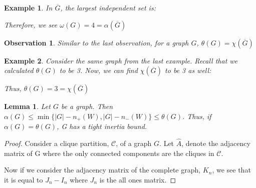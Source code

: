 \documentclass[12pt]{article}
\theoremstyle{parenbold}
\newtheorem{exmp}{Example}[section]
\newtheorem{observation}{Observation}[section]
\newtheorem{lemma}{Lemma}[section]
\begin{document}
\begin{exmp}
In $\overline{G}$, the largest independent set is:


Therefore, we see $\omega(G) = 4 = \alpha(\overline{G})$

\end{exmp}

\begin{observation} \label{obs2}
Similar to the last observation, for a graph $G$, $\theta(G) = \chi(\overline{G})$
\end{observation}

\begin{exmp}
Consider the same graph from the last example. Recall that we calculated $\theta(G)$ to be 3. Now, we can find $\chi(\overline{G})$ to be 3 as well:


Thus, $\theta(G) = 3 = \chi(\overline{G})$

\end{exmp}

\begin{lemma} \label{lem:alphatheta}
Let $G$ be a graph. Then $\alpha(G) \leq \min\{|G| - n_+(W),|G|-n_-(W)\} \leq \theta(G)$. Thus, if $\alpha(G) = \theta(G)$, G has a tight inertia bound. 
\cite{elzinga2007minimum}
\end{lemma}

\begin{proof}
Consider a clique partition, $\mathcal{C}$, of a graph $G$. Let $\hat{A}$, denote the adjacency matrix of G where the only connected components are the cliques in $\mathcal{C}$.

Now if we consider the adjacency matrix of the complete graph, $K_n$, we see that it is equal to $J_n - I_n$ where $J_n$ is the all ones matrix. 
\end{proof}
\end{document}
